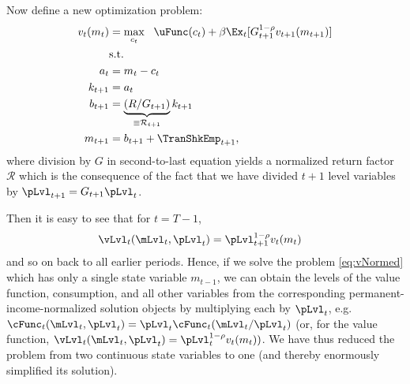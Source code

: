 Now define a new optimization problem:
  \begin{equation}\begin{gathered}\begin{aligned}
        v_{t}({m}_{t}) & = \max_{{c}_{t}} ~~ \uFunc({c}_{t})+{\beta}\Ex_{t}[ G_{t+1}^{1-\rho}v_{t+1}({m}_{t+1})] \label{eq:vNormed}                   \\
                                         & \text{s.t.}                                                                                 \\
        {a}_{t}                       & = {m}_{t}-{c}_{t}                                                                     \\
        {k}_{t+1}                     & = {a}_{t}                                                                                \\
        {b}_{t+1}                     & = \underbrace{\left(R/G_{t+1}\right)}_{\equiv \mathcal{R}_{t+1}}{k}_{t+1} \\
        {m}_{t+1}                        & = {b}_{t+1}+\TranShkEmp_{t+1},
      \end{aligned}\end{gathered}\end{equation}
where division by $G$ in second-to-last equation yields a normalized return factor $\mathcal{R}$ which is the consequence of the fact that we have divided $t+1$ level variables by $\pLvl_{t+1}=G_{t+1}\pLvl_{t}$.

Then it is easy to see that for $t=T-1$, 
\begin{equation*}\begin{gathered}\begin{aligned}
      \vLvl_{t}(\mLvl_{t},\pLvl_{t}) & =  \pLvl_{t+1}^{1-\rho}v_{t}({m}_{t})
    \end{aligned}\end{gathered}\end{equation*}
and so on back to all earlier periods.  Hence, if we solve the problem \eqref{eq:vNormed} which has only a single state variable $m_{t-1}$, we can obtain the levels of the value function, consumption, and all other variables from the corresponding permanent-income-normalized solution objects by multiplying each by $\pLvl_{t}$, e.g.\ $\cFunc_{t}(\mLvl_{t},\pLvl_{t})=\pLvl_{t}\cFunc_{t}(\mLvl_{t}/\pLvl_{t})$ (or, for the value function, $\vLvl _{t}(\mLvl_{t},\pLvl_{t}) = \pLvl_{t}^{1-\rho}v_{t}({m}_{t}))$.  We have thus reduced the problem from two continuous state variables to one (and thereby enormously simplified its solution).

